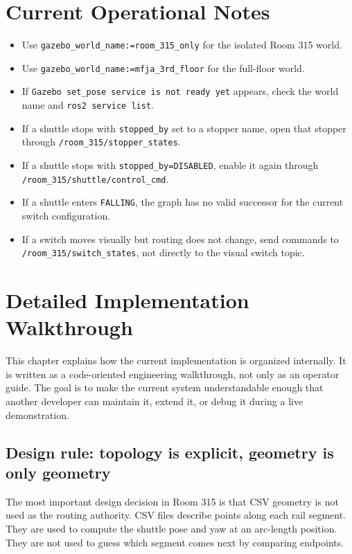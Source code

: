 \documentclass[12pt,a4paper]{report}
\begin{document}
\chapter{Current Operational Notes}

\begin{itemize}
\item Use \texttt{gazebo\_world\_name:=room\_315\_only} for the isolated Room
315 world.
\item Use \texttt{gazebo\_world\_name:=mfja\_3rd\_floor} for the full-floor
world.
\item If \texttt{Gazebo set\_pose service is not ready yet} appears, check the
world name and \texttt{ros2 service list}.
\item If a shuttle stops with \texttt{stopped\_by} set to a stopper name, open
that stopper through \texttt{/room\_315/stopper\_states}.
\item If a shuttle stops with \texttt{stopped\_by=DISABLED}, enable it again
through \texttt{/room\_315/shuttle/control\_cmd}.
\item If a shuttle enters \texttt{FALLING}, the graph has no valid successor for
the current switch configuration.
\item If a switch moves visually but routing does not change, send commands to
\texttt{/room\_315/switch\_states}, not directly to the visual switch topic.
\end{itemize}

\chapter{Detailed Implementation Walkthrough}

This chapter explains how the current implementation is organized internally.
It is written as a code-oriented engineering walkthrough, not only as an
operator guide. The goal is to make the current system understandable enough
that another developer can maintain it, extend it, or debug it during a live
demonstration.

\section{Design rule: topology is explicit, geometry is only geometry}

The most important design decision in Room 315 is that CSV geometry is not used
as the routing authority. CSV files describe points along each rail segment.
They are used to compute the shuttle pose and yaw at an arc-length position.
They are not used to guess which segment comes next by comparing endpoints.
\end{document}
